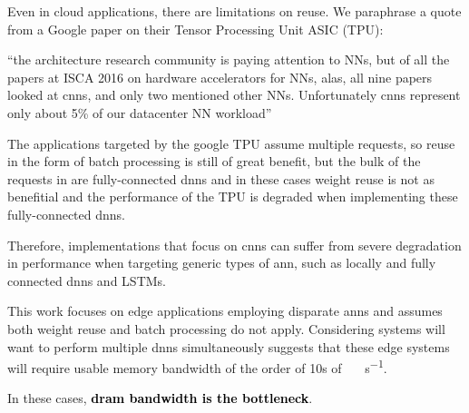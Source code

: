 \iffalse
There important application is disparate \ac{ann}s because specifically a form of \ac{dnn}, Convolutional Neural networks (\ac{cnn}) have gotten good press recently, but they are not the only \ac{dnn}.
\fi

Even in cloud applications, there are limitations on reuse. We paraphrase a quote from a Google paper \cite{tensorflow2015-whitepaper} on their Tensor Processing Unit ASIC (TPU):

\hyphenquote{american}{the architecture research community is paying attention to NNs, but of all the papers at ISCA 2016 on hardware accelerators for NNs, alas, all nine papers looked at \ac{cnn}s, and only two mentioned other NNs. Unfortunately \ac{cnn}s represent only about 5\% of our datacenter NN workload}

The applications targeted by the google TPU \cite{tensorflow2015-whitepaper} assume multiple requests, so reuse in the form of batch processing is still of great benefit, but the bulk of the requests in \cite{tensorflow2015-whitepaper} are fully-connected \ac{dnn}s and in these cases weight reuse is not as benefitial and the performance of the TPU is degraded when implementing these fully-connected \ac{dnn}s.

Therefore, implementations that focus on \ac{cnn}s can suffer from severe degradation in performance when targeting generic types of \ac{ann}, such as locally and fully connected \ac{dnn}s and LSTMs.

This work focuses on edge applications employing disparate \ac{ann}s and assumes both weight reuse and batch processing do not apply.
Considering systems will want to perform multiple \ac{dnn}s simultaneously suggests that these edge systems will require usable memory bandwidth of the order of 10s of \SI[per-mode=symbol]{}{\tera \bit \per \second}.

In these cases, \textbf{\textcolor{black}{\ac{dram} bandwidth is the bottleneck}}.
\fi


\iffalse

\iffalse
So considering the performance improvements observed in other applications, it is expected that many customer facing or edge applications will implement multiple instances of artificial neural networks to perform various functions.
have very large memory and processing requirements.
require multiple instances of \ac{ann}s of similar size to the \ac{ann} described in \cite{krizhevsky2012imagenet}.

For example employing multiple cameras or monitoring and controlling different systems in a drone, a automobile each with an image recognition \ac{ann}\cite{krizhevsky2012imagenet}\cite{bojarski2016end} for navigation, engine monitoring along with other system control.
\fi

